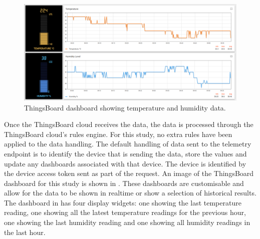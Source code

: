 \begin{figure}[H]
    \centering
    \includegraphics[width=\imageWidth\textwidth]{assets/thingsboard_dashboard.png}
    \caption{\label{fig:thingsboard_dashboard} ThingsBoard dashboard showing temperature and humidity data.}
\end{figure}





Once the ThingsBoard cloud receives the data, the data is processed through the
ThingsBoard cloud's rules engine. For this study, no extra rules have been 
applied to the data handling. The default handling of data sent to the telemetry
endpoint is to identify the device that is sending the data, store the values
and update any dashboards associated with that device. The device is 
identified by the device access token sent as part of the request. An image 
of the ThingsBoard dashboard for this study is shown in 
. These dashboards are customisable and allow
for the data to be shown in realtime or show a selection of historical results.
The dashboard in  has four display widgets:
one showing the last temperature reading, one showing all the latest temperature
readings for the previous hour, one showing the last humidity reading and one
showing all humidity readings in the last hour.
